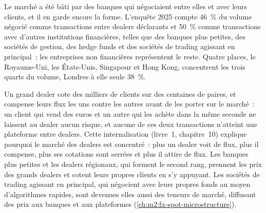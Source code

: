 Le marché a été bâti par des banques qui négociaient entre elles et avec leurs clients,
et il en garde encore la forme. L'enquête 2025 compte 46~\% du volume négocié comme transactions
entre dealers déclarants et 50~\% comme transactions avec d'autres institutions financières,
telles que des banques plus petites, des sociétés de gestion, des hedge funds et des sociétés de trading agissant en principal~;
les entreprises non financières représentent le reste. Quatre places, le Royaume-Uni, les
États-Unis, Singapour et Hong Kong, concentrent les trois quarts du volume, Londres à elle seule
38~\%.

Un grand dealer cote des milliers de clients sur des centaines de paires, et compense leurs
flux les uns contre les autres avant de les porter sur le marché~: un client qui vend des euros
et un autre qui les achète dans la même seconde ne laissent au dealer aucun risque,
et aucune de ces deux transactions n'atteint une plateforme entre dealers. Cette internalisation (livre~1, chapitre~10) explique pourquoi le marché des dealers est concentré~:
plus un dealer voit de flux,
plus il compense, plus ses cotations sont serrées et plus il attire de flux.
Les banques plus petites et les dealers régionaux, qui forment le second rang, prennent les prix
des grands dealers et cotent leurs propres clients en s'y appuyant. Les sociétés de trading agissant en principal, qui négocient
avec leurs propres fonds au moyen d'algorithmes rapides, sont devenues elles aussi des teneurs de marché,
diffusant des prix aux banques et aux plateformes (\cref{ch:m2:fx-spot-microstructure}).

